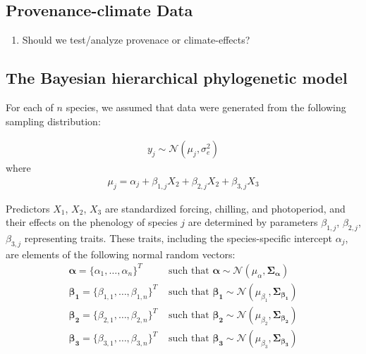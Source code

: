 \documentclass{article}\usepackage[]{graphicx}\usepackage[]{color}
\begin{document}
\subsection*{Provenance-climate Data}
\begin{enumerate}
\item Should we test/analyze provenace or climate-effects? 
\end{enumerate}




\subsection*{The Bayesian hierarchical phylogenetic model}


For each of $n$ species, we assumed that data were generated from the following sampling distribution:

\begin{align}
  \label{modely}
  y_j \sim \mathcal{N}(\mu_j, \sigma_e^2)
\end{align}
where
\begin{align}
  \label{modelmu}
  \mu_j = \alpha_j + \beta_{1,j} X_2 + \beta_{2,j} X_2 + \beta_{3,j} X_3
\end{align}

Predictors $X_1$, $X_2$, $X_3$ are standardized forcing, chilling, and photoperiod, and their effects on the phenology of species $j$ are determined by parameters $\beta_{1,j}$, $\beta_{2,j}$, $\beta_{3,j}$ representing traits. These traits, including the species-specific intercept $\alpha_j$, are elements of the following normal random vectors:
\begin{align}
  \boldsymbol{\alpha} = \{\alpha_1, \ldots, \alpha_n\}^T & \text{ such that }
  \boldsymbol{\alpha} \sim \mathcal{N}(\mu_{\alpha},\boldsymbol{\Sigma_{\alpha}}) \\
  \boldsymbol{\beta_1} =  \{\beta_{1,1}, \ldots, \beta_{1,n}\}^T & \text{ such that }
  \boldsymbol{\beta_1} \sim \mathcal{N}(\mu_{\beta_1},\boldsymbol{\Sigma_{\beta_1}}) \nonumber \\
  \boldsymbol{\beta_2} =  \{\beta_{2,1}, \ldots, \beta_{2,n}\}^T & \text{ such that }
  \boldsymbol{\beta_2} \sim \mathcal{N}(\mu_{\beta_2},\boldsymbol{\Sigma_{\beta_2}}) \nonumber \\
  \boldsymbol{\beta_3} =  \{\beta_{3,1}, \ldots, \beta_{3,n}\}^T & \text{ such that }
  \boldsymbol{\beta_3} \sim \mathcal{N}(\mu_{\beta_3},\boldsymbol{\Sigma_{\beta_3}}) \nonumber
\end{align}
\end{document}
